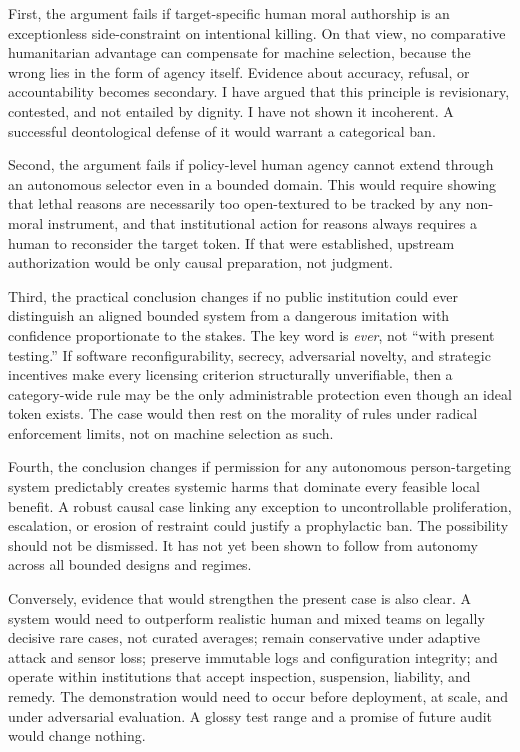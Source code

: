 \documentclass[11pt]{article}
\begin{document}
First, the argument fails if target-specific human moral authorship is an exceptionless side-constraint on intentional killing. On that view, no comparative humanitarian advantage can compensate for machine selection, because the wrong lies in the form of agency itself. Evidence about accuracy, refusal, or accountability becomes secondary. I have argued that this principle is revisionary, contested, and not entailed by dignity. I have not shown it incoherent. A successful deontological defense of it would warrant a categorical ban.

Second, the argument fails if policy-level human agency cannot extend through an autonomous selector even in a bounded domain. This would require showing that lethal reasons are necessarily too open-textured to be tracked by any non-moral instrument, and that institutional action for reasons always requires a human to reconsider the target token. If that were established, upstream authorization would be only causal preparation, not judgment.

Third, the practical conclusion changes if no public institution could ever distinguish an aligned bounded system from a dangerous imitation with confidence proportionate to the stakes. The key word is \emph{ever}, not ``with present testing.'' If software reconfigurability, secrecy, adversarial novelty, and strategic incentives make every licensing criterion structurally unverifiable, then a category-wide rule may be the only administrable protection even though an ideal token exists. The case would then rest on the morality of rules under radical enforcement limits, not on machine selection as such.

Fourth, the conclusion changes if permission for any autonomous person-targeting system predictably creates systemic harms that dominate every feasible local benefit. A robust causal case linking any exception to uncontrollable proliferation, escalation, or erosion of restraint could justify a prophylactic ban. The possibility should not be dismissed. It has not yet been shown to follow from autonomy across all bounded designs and regimes.

Conversely, evidence that would strengthen the present case is also clear. A system would need to outperform realistic human and mixed teams on legally decisive rare cases, not curated averages; remain conservative under adaptive attack and sensor loss; preserve immutable logs and configuration integrity; and operate within institutions that accept inspection, suspension, liability, and remedy. The demonstration would need to occur before deployment, at scale, and under adversarial evaluation. A glossy test range and a promise of future audit would change nothing.
\end{document}
